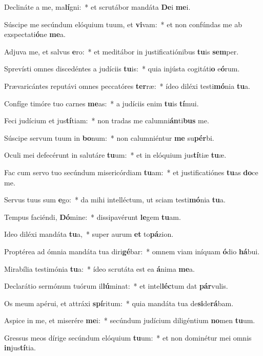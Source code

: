 \item Declináte a me, ma\textbf{lí}gni:~* et scrutábor mandáta \textbf{De}i \textbf{me}i.
\item Súscipe me secúndum elóquium tuum, et \textbf{vi}vam:~* et non confúndas me ab exspectati\textbf{ó}ne \textbf{me}a.
\item Adjuva me, et salvus \textbf{e}ro:~* et meditábor in justificatiónibus \textbf{tu}is \textbf{sem}per.
\item Sprevísti omnes discedéntes a judíciis \textbf{tu}is:~* quia injústa cogitáti\textbf{o} e\textbf{ó}rum.
\item Prævaricántes reputávi omnes peccatóres \textbf{ter}ræ:~* ídeo diléxi testi\textbf{mó}nia \textbf{tu}a.
\item Confíge timóre tuo carnes \textbf{me}as:~* a judíciis enim \textbf{tu}is \textbf{tí}mui.
\item Feci judícium et jus\textbf{tí}tiam:~* non tradas me calumni\textbf{án}ti\textbf{bus} me.
\item Súscipe servum tuum in \textbf{bo}num:~* non calumniéntur \textbf{me} su\textbf{pér}bi.
\item Oculi mei defecérunt in salutáre \textbf{tu}um:~* et in elóquium jus\textbf{tí}tiæ \textbf{tu}æ.
\item Fac cum servo tuo secúndum misericórdiam \textbf{tu}am:~* et justificatiónes \textbf{tu}as \textbf{do}ce me.
\item Servus tuus sum \textbf{e}go:~* da mihi intelléctum, ut sciam testi\textbf{mó}nia \textbf{tu}a.
\item Tempus faciéndi, \textbf{Dó}mine:~* dissipavérunt \textbf{le}gem \textbf{tu}am.
\item Ideo diléxi mandáta \textbf{tu}a,~* super aurum \textbf{et} to\textbf{pá}zion.
\item Proptérea ad ómnia mandáta tua diri\textbf{gé}bar:~* omnem viam iníquam \textbf{ó}dio \textbf{há}bui.
\item Mirabília testimónia \textbf{tu}a:~* ídeo scrutáta est ea \textbf{á}nima \textbf{me}a.
\item Declarátio sermónum tuórum il\textbf{lú}minat:~* et intel\textbf{léc}tum dat \textbf{pár}vulis.
\item Os meum apérui, et attráxi \textbf{spí}ritum:~* quia mandáta tua de\textbf{si}de\textbf{rá}bam.
\item Aspice in me, et miserére \textbf{me}i:~* secúndum judícium diligéntium \textbf{no}men \textbf{tu}um.
\item Gressus meos dírige secúndum elóquium \textbf{tu}um:~* et non dominétur mei omnis \textbf{in}jus\textbf{tí}tia.
